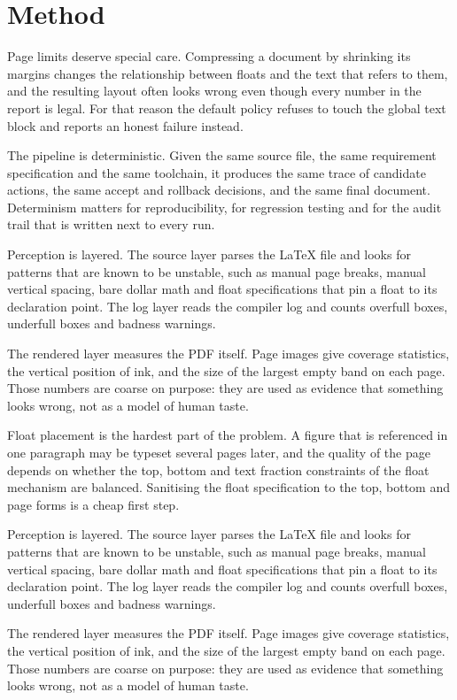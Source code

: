 \documentclass[10pt,a4paper]{article}
\begin{document}
\newpage

\section{Method}
Page limits deserve special care. Compressing a document by shrinking its margins changes the relationship between floats and the text that refers to them, and the resulting layout often looks wrong even though every number in the report is legal. For that reason the default policy refuses to touch the global text block and reports an honest failure instead.

The pipeline is deterministic. Given the same source file, the same requirement specification and the same toolchain, it produces the same trace of candidate actions, the same accept and rollback decisions, and the same final document. Determinism matters for reproducibility, for regression testing and for the audit trail that is written next to every run.

Perception is layered. The source layer parses the LaTeX file and looks for patterns that are known to be unstable, such as manual page breaks, manual vertical spacing, bare dollar math and float specifications that pin a float to its declaration point. The log layer reads the compiler log and counts overfull boxes, underfull boxes and badness warnings.

The rendered layer measures the PDF itself. Page images give coverage statistics, the vertical position of ink, and the size of the largest empty band on each page. Those numbers are coarse on purpose: they are used as evidence that something looks wrong, not as a model of human taste.

Float placement is the hardest part of the problem. A figure that is referenced in one paragraph may be typeset several pages later, and the quality of the page depends on whether the top, bottom and text fraction constraints of the float mechanism are balanced. Sanitising the float specification to the top, bottom and page forms is a cheap first step.

Perception is layered. The source layer parses the LaTeX file and looks for patterns that are known to be unstable, such as manual page breaks, manual vertical spacing, bare dollar math and float specifications that pin a float to its declaration point. The log layer reads the compiler log and counts overfull boxes, underfull boxes and badness warnings.

The rendered layer measures the PDF itself. Page images give coverage statistics, the vertical position of ink, and the size of the largest empty band on each page. Those numbers are coarse on purpose: they are used as evidence that something looks wrong, not as a model of human taste.
\end{document}
